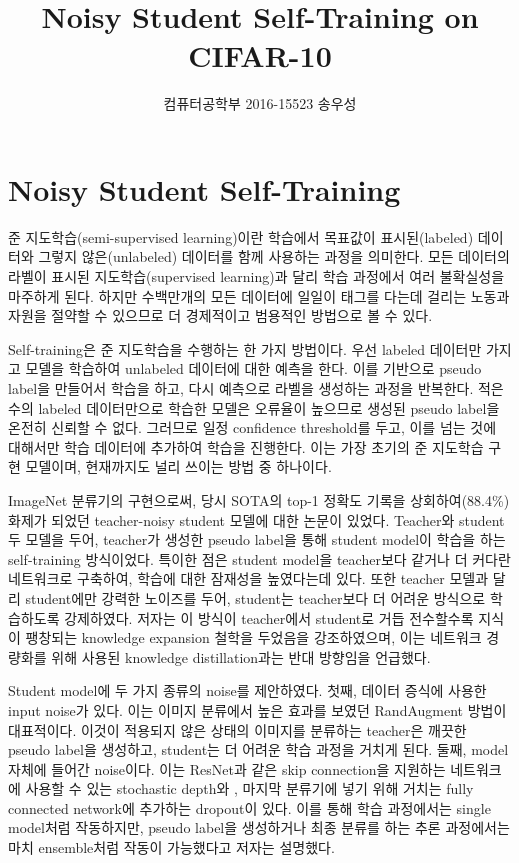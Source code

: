 \documentclass[a4paper, 10pt]{article}
\title{Noisy Student Self-Training on CIFAR-10}
\author{컴퓨터공학부 2016-15523 송우성}
\begin{document}
\maketitle

\section{Noisy Student Self-Training}
준 지도학습(semi-supervised learning)이란 학습에서 목표값이 표시된(labeled)
데이터와 그렇지 않은(unlabeled) 데이터를 함께 사용하는 과정을 의미한다. 모든
데이터의 라벨이 표시된 지도학습(supervised learning)과 달리 학습 과정에서 여러
불확실성을 마주하게 된다. 하지만 수백만개의 모든 데이터에 일일이 태그를 다는데
걸리는 노동과 자원을 절약할 수 있으므로 더 경제적이고 범용적인 방법으로 볼 수
있다. \cite{zhu2006semisupervised}

Self-training은 준 지도학습을 수행하는 한 가지 방법이다. 우선 labeled 데이터만
가지고 모델을 학습하여 unlabeled 데이터에 대한 예측을 한다. 이를 기반으로 pseudo
label을 만들어서 학습을 하고, 다시 예측으로 라벨을 생성하는 과정을 반복한다.
적은 수의 labeled 데이터만으로 학습한 모델은 오류율이 높으므로 생성된 pseudo
label을 온전히 신뢰할 수 없다. 그러므로 일정 confidence threshold를 두고, 이를
넘는 것에 대해서만 학습 데이터에 추가하여 학습을 진행한다. 이는 가장 초기의 준
지도학습 구현 모델이며, 현재까지도 널리 쓰이는 방법 중 하나이다.
\cite{zhu2006semisupervised}

ImageNet 분류기의 구현으로써, 당시 SOTA의 top-1 정확도 기록을 상회하여(88.4\%)
화제가 되었던 teacher-noisy student 모델에 대한 논문이 있었다.
\cite{xie2020selftraining} Teacher와 student 두 모델을 두어, teacher가 생성한
pseudo label을 통해 student model이 학습을 하는 self-training 방식이었다. 특이한
점은 student model을 teacher보다 같거나 더 커다란 네트워크로 구축하여, 학습에
대한 잠재성을 높였다는데 있다. 또한 teacher 모델과 달리 student에만 강력한
노이즈를 두어, student는 teacher보다 더 어려운 방식으로 학습하도록 강제하였다.
저자는 이 방식이 teacher에서 student로 거듭 전수할수록 지식이 팽창되는 knowledge
expansion 철학을 두었음을 강조하였으며, 이는 네트워크 경량화를 위해 사용된
knowledge distillation과는 \cite{hinton2015distilling} 반대 방향임을 언급했다.

Student model에 두 가지 종류의 noise를 제안하였다. 첫째, 데이터 증식에 사용한
input noise가 있다. 이는 이미지 분류에서 높은 효과를 보였던 RandAugment 방법이
\cite{cubuk2019randaugment} 대표적이다. 이것이 적용되지 않은 상태의 이미지를
분류하는 teacher은 깨끗한 pseudo label을 생성하고, student는 더 어려운 학습
과정을 거치게 된다. 둘째, model 자체에 들어간 noise이다. 이는 ResNet과 같은 skip
connection을 지원하는 네트워크에 사용할 수 있는 stochastic depth와
\cite{huang2016deep}, 마지막 분류기에 넣기 위해 거치는 fully connected network에
추가하는 dropout이 있다. 이를 통해 학습 과정에서는 single model처럼 작동하지만,
pseudo label을 생성하거나 최종 분류를 하는 추론 과정에서는 마치 ensemble처럼
작동이 가능했다고 저자는 설명했다. \cite{xie2020selftraining}
\end{document}
